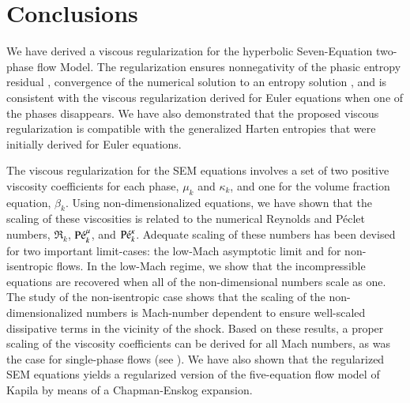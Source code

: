 \section{Conclusions}\label{sec:conclusion}
%
We have derived a viscous regularization for the hyperbolic Seven-Equation two-phase flow Model. The regularization ensures nonnegativity of the phasic entropy residual 
, 
convergence of the numerical solution to an entropy solution  , 
and is consistent with the viscous regularization derived for Euler equations when one of the phases disappears. 
We have also demonstrated that the proposed viscous regularization is compatible with the generalized Harten entropies 
that were initially derived for Euler equations. 

The viscous regularization for the SEM equations involves a set of two positive viscosity coefficients for each phase, $\mu_k$ and $\kappa_k$, and one for the volume 
fraction equation, $\beta_k$. Using non-dimensionalized equations, we have shown that the scaling of these viscosities is related to the numerical Reynolds 
and P\'eclet numbers, $\Re_k$, $\textrm{P\'e}_k^\mu$, and $\textrm{P\'e}_k^\kappa$. 
Adequate scaling of these numbers has been devised for two important limit-cases: the low-Mach asymptotic limit and for non-isentropic flows. In the low-Mach regime, 
we show that the incompressible equations are recovered when all of the non-dimensional numbers scale as one. The study of the non-isentropic case 
shows that the scaling of the non-dimensionalized numbers is Mach-number dependent to ensure well-scaled dissipative terms in the vicinity of the shock.
Based on these results, a proper scaling of the viscosity coefficients can be derived for all Mach numbers, as was the case for single-phase flows (see \cite{Marco_paper_low_mach}). 
%
We have also shown that the regularized SEM equations yields a regularized version of the five-equation flow model of Kapila by means of a Chapman-Enskog expansion.

